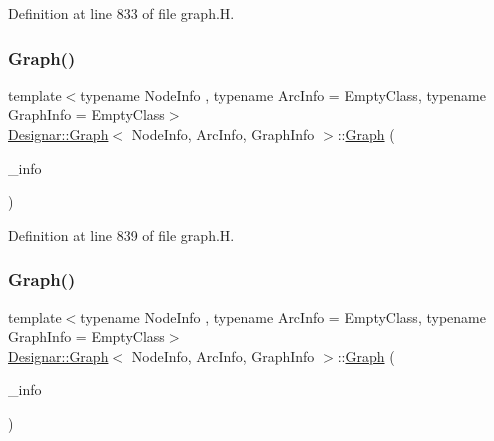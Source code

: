 Definition at line 833 of file graph.\+H.

\mbox{\label{class_designar_1_1_graph_a61f5be7345295aa375f3a329ded36c17}} 
\subsubsection{\texorpdfstring{Graph()}{Graph()}\hspace{0.1cm}{\footnotesize\ttfamily [2/5]}}
{\footnotesize\ttfamily template$<$typename Node\+Info , typename Arc\+Info  = Empty\+Class, typename Graph\+Info  = Empty\+Class$>$ \\
\hyperlink{class_designar_1_1_graph}{Designar\+::\+Graph}$<$ Node\+Info, Arc\+Info, Graph\+Info $>$\+::\hyperlink{class_designar_1_1_graph}{Graph} (\begin{DoxyParamCaption}\item[{const Graph\+Info \&}]{\+\_\+info }\end{DoxyParamCaption})\hspace{0.3cm}{\ttfamily [inline]}}



Definition at line 839 of file graph.\+H.

\mbox{\label{class_designar_1_1_graph_a14f42f1511cc6e9edf7f54f656febf1e}} 
\subsubsection{\texorpdfstring{Graph()}{Graph()}\hspace{0.1cm}{\footnotesize\ttfamily [3/5]}}
{\footnotesize\ttfamily template$<$typename Node\+Info , typename Arc\+Info  = Empty\+Class, typename Graph\+Info  = Empty\+Class$>$ \\
\hyperlink{class_designar_1_1_graph}{Designar\+::\+Graph}$<$ Node\+Info, Arc\+Info, Graph\+Info $>$\+::\hyperlink{class_designar_1_1_graph}{Graph} (\begin{DoxyParamCaption}\item[{Graph\+Info \&\&}]{\+\_\+info }\end{DoxyParamCaption})\hspace{0.3cm}{\ttfamily [inline]}}



